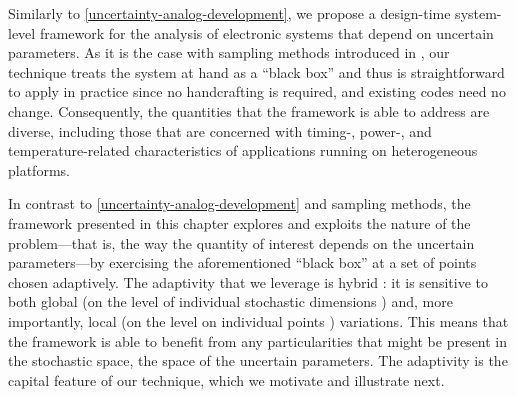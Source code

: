 Similarly to \cref{uncertainty-analog-development}, we propose a design-time
system-level framework for the analysis of electronic systems that depend on
uncertain parameters. As it is the case with sampling methods introduced in
, our technique treats the system at hand as a ``black box'' and
thus is straightforward to apply in practice since no handcrafting is required,
and existing codes need no change. Consequently, the quantities that the
framework is able to address are diverse, including those that are concerned
with timing-, power-, and temperature-related characteristics of applications
running on heterogeneous platforms.

In contrast to \cref{uncertainty-analog-development} and sampling methods, the
framework presented in this chapter explores and exploits the nature of the
problem---that is, the way the quantity of interest depends on the uncertain
parameters---by exercising the aforementioned ``black box'' at a set of points
chosen adaptively. The adaptivity that we leverage is hybrid \cite{jakeman2012}:
it is sensitive to both global (on the level of individual stochastic dimensions
\cite{klimke2006}) and, more importantly, local (on the level on individual
points \cite{ma2009}) variations. This means that the framework is able to
benefit from any particularities that might be present in the stochastic space,
the space of the uncertain parameters. The adaptivity is the capital feature of
our technique, which we motivate and illustrate next.
